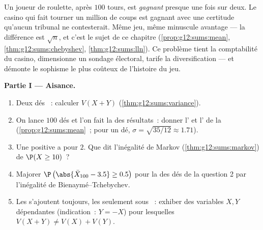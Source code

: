 \begin{problem}
\label{pb:g12:sums:1}
Un joueur de roulette, après $100$ tours, est \emph{gagnant} presque
une fois sur deux. Le casino qui fait tourner un million de coups
est gagnant avec une certitude qu'aucun tribunal ne contesterait.
Même jeu, même minuscule avantage --- la différence est $\sqrt n$,
et c'est le sujet de ce chapitre (\cref{prop:g12:sums:mean},
\cref{thm:g12:sums:chebyshev}, \cref{thm:g12:sums:lln}). Ce problème
tient la comptabilité du casino, dimensionne un sondage électoral,
tarife la diversification --- et démonte le sophisme le plus coûteux
de l'histoire du jeu.

\medskip
\noindent\textbf{Partie I --- Aisance.}
\begin{enumerate}
  \item Deux dés ~: calculer $V(X + Y)$
        (\cref{thm:g12:sums:variance}).
  \item On lance $100$ dés  et l'on fait la  des
        résultats~: donner l' et l' de la  (\cref{prop:g12:sums:mean}~; pour un dé,
        $\sigma = \sqrt{35/12} \approx 1.71$).
  \item Une  positive a pour  $2$. Que
        dit l'inégalité de Markov (\cref{thm:g12:sums:markov}) de
        $\P(X \geq 10)$~?
  \item Majorer $\P\left(\abs{\bar X_{100} - 3.5} \geq
        0.5\right)$ pour la  des dés de la question 2 par
        l'inégalité de Bienaymé--Tchebychev.
  \item Les  s'ajoutent toujours, les  seulement
        sous ~: exhiber des variables $X, Y$ dépendantes
        (indication~: $Y = -X$) pour lesquelles
        $V(X + Y) \neq V(X) + V(Y)$.
\end{enumerate}


\end{problem}
